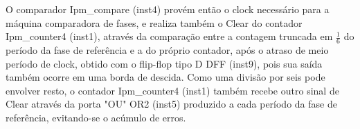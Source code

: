 O comparador Ipm\_compare (inst4) provém então o clock necessário para a
máquina comparadora de fases, e realiza também o Clear do contador Ipm\_counter4 (inst1), através da comparação entre a contagem truncada em $\frac{1}{6}$ do período da fase de referência e a do próprio contador, após o atraso de meio período de clock, obtido com o flip-flop tipo D DFF (inst9), pois sua saída também ocorre em uma borda de descida. Como uma divisão por seis pode envolver resto, o contador Ipm\_counter4 (inst1) também recebe outro sinal de Clear através da porta "OU" OR2 (inst5) produzido a cada período da fase de referência, evitando-se o acúmulo de erros.
